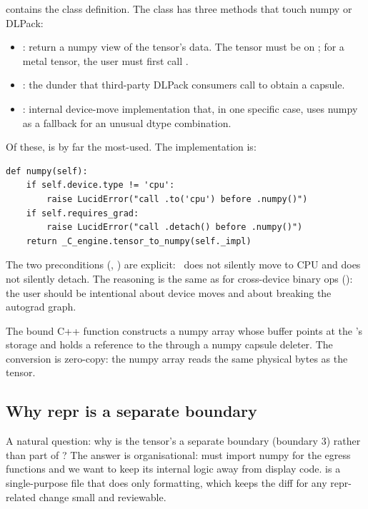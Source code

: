  contains the  class
definition. The class has three methods that touch numpy or
DLPack:

\begin{itemize}
  \item {}: return a numpy view of the tensor's
    data. The tensor must be on ; for a metal
    tensor, the user must first call .
  \item {}: the dunder that
    third-party DLPack consumers call to obtain a capsule.
  \item {}: internal device-move
    implementation that, in one specific case, uses numpy as a
    fallback for an unusual dtype combination.
\end{itemize}

Of these,  is by far the most-used. The
implementation is:

\begin{lstlisting}[style=lucid,language=LucidPython]
def numpy(self):
    if self.device.type != 'cpu':
        raise LucidError("call .to('cpu') before .numpy()")
    if self.requires_grad:
        raise LucidError("call .detach() before .numpy()")
    return _C_engine.tensor_to_numpy(self._impl)
\end{lstlisting}

The two preconditions (, ) are
explicit: \Lucid\ does not silently move to CPU and does not
silently detach. The reasoning is the same as for cross-device
binary ops (): the user should be
intentional about device moves and about breaking the autograd
graph.

The  bound C++ function constructs a numpy
array whose buffer points at the 's storage and
holds a reference to the  through a numpy capsule
deleter. The conversion is zero-copy: the numpy array reads the
same physical bytes as the tensor.

\subsection{Why repr is a separate boundary}
\label{ssec:bridge_boundaries:repr_separate}

A natural question: why is the tensor's  a
separate boundary (boundary 3) rather than part of
? The answer is organisational: 
must import numpy for the egress functions and we want to keep its
internal logic away from display code.  is a
single-purpose file that does only formatting, which keeps the
diff for any repr-related change small and reviewable.

